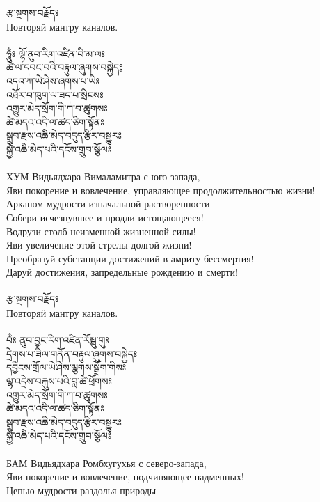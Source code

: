 {\ti རྩ་སྔགས་བརྗོདཿ}\\
Повторяй мантру каналов.\\
\\
{\ti ཧཱུྃཿ ལྷོ་ནུབ་རིག་འཛིན་བི་མ་ལཿ \\
ཚེ་ལ་དབང་བའི་བརྟུལ་ཞུགས་བསྐྱེད༔\\
འདའ་ཀ་ཡེ་ཤེས་ཞགས་པ་ཡིཿ \\
འཐོར་བ་ཁུག་ལ་ཟད་པ་སྲིངསཿ \\
འགྱུར་མེད་སྲོག་གི་ཀ་བ་ཚུགསཿ \\
ཚེ་མདའ་འདི་ལ་ཚད་ཅིག་སྟོནཿ \\
སྒྲུབ་རྫས་འཆི་མེད་བདུད་རྩིར་བསྒྱུརཿ \\
སྐྱེ་འཆི་མེད་པའི་དངོས་གྲུབ་སྩོལཿ }\\
\\
ХУМ  Видьядхара Вималамитра с юго-запада,\\
Яви покорение и вовлечение, управляющее продолжительностью жизни!\\
Арканом мудрости изначальной растворенности\\
Собери исчезнувшее и продли истощающееся!\\
Водрузи столб неизменной жизненной силы!\\
Яви увеличение этой стрелы долгой жизни!\\
Преобразуй субстанции достижений в амриту бессмертия!\\
Даруй достижения, запредельные рождению и смерти!\\
\\
{\ti རྩ་སྔགས་བརྗོདཿ }\\
Повторяй мантру каналов.\\
\\
{\ti བྃཿ ནུབ་བྱང་རིག་འཛིན་རོམྦུ་གུཿ \\
དྲེགས་པ་ཟིལ་གནོན་བརྟུལ་ཞུགས་བསྐྱེདཿ\\ 
དབྱིངས་གྲོལ་ཡེ་ཤེས་ལྕགས་སྒྲོག་གིསཿ \\
ལྷ་འདྲེས་བརྐུས་པའི་བླ་ཚེ་ཕྲོགསཿ \\
འགྱུར་མེད་སྲོག་གི་ཀ་བ་ཚུགསཿ \\
ཚེ་མདའ་འདི་ལ་ཚད་ཅིག་སྟོནཿ \\
སྒྲུབ་རྫས་འཆི་མེད་བདུད་རྩིར་བསྒྱུརཿ\\ 
སྐྱེ་འཆི་མེད་པའི་དངོས་གྲུབ་སྩོལཿ }\\
\\
БАМ  Видьядхара Ромбхугухья с северо-запада,\\
Яви покорение и вовлечение, подчиняющее надменных!\\
Цепью мудрости раздолья природы\\
